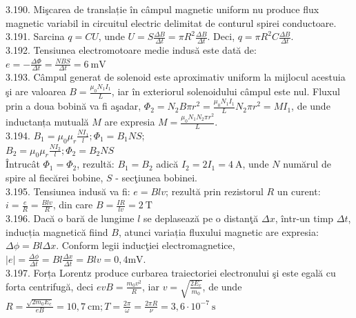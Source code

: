 \begin{center}
3.190. Mişcarea de translație în câmpul magnetic uniform nu produce flux magnetic variabil in circuitul electric delimitat de conturul spirei conductoare.\\

3.191. Sarcina $q=C U$, unde $U=S \frac{\Delta B}{\Delta t}=\pi R^{2} \frac{\Delta B}{\Delta t}$. Deci, $q=\pi R^{2} C \frac{\Delta B}{\Delta t}$.\\

3.192. Tensiunea electromotoare medie indusă este dată de:\\$e=-\frac{\Delta \Phi}{\Delta t}=\frac{N B S}{\Delta t}=6 \mathrm{~mV}$\\

3.193. Câmpul generat de solenoid este aproximativ uniform la mijlocul acestuia şi are valoarea $B=\frac{\mu_{0} N_{1} I_{1}}{L}$, iar în exteriorul solenoidului câmpul este nul. Fluxul prin a doua bobină va fi aşadar, $\Phi_{2}=N_{2} B \pi r^{2}=\frac{\mu_{0} N_{1} I_{1}}{L} N_{2} \pi r^{2}=M I_{1}$, de unde inductanța mutuală $M$ are expresia $M=\frac{\mu_{0} N_{1} N_{2} \pi r^{2}}{L}$.\\

3.194. $B_{1}=\mu_{0} \mu_{r} \frac{N I_{1}}{l} ; \Phi_{1}=B_{1} N S$;\\$B_{2}=\mu_{0} \mu_{r} \frac{N I_{2}}{l} ; \Phi_{2}=B_{2} N S$\\Întrucât $\Phi_{1}=\Phi_{2}$, rezultă: $B_{1}=B_{2}$ adică $I_{2}=2 I_{1}=4 \mathrm{~A}$, unde $N$ numărul de spire al fiecărei bobine, $S$ - secţiunea bobinei.\\

3.195. Tensiunea indusă va fi: $e=B l v$; rezultă prin rezistorul $R$ un curent:\\$i=\frac{e}{R}=\frac{B l v}{R}$, din care $B=\frac{I R}{l v}=2 \mathrm{~T}$\\

3.196. Dacă o bară de lungime $l$ se deplasează pe o distanţă $\Delta x$, într-un timp $\Delta t$, inducția magnetică fiind $B$, atunci variația fluxului magnetic are expresia: $\Delta \phi=B l \Delta x$. Conform legii inducţiei electromagnetice,\\$|e|=\frac{\Delta \phi}{\Delta t}=B l \frac{\Delta x}{\Delta t}=B l v=0,4 \mathrm{mV} .$\\

3.197. Forța Lorentz produce curbarea traiectoriei electronului şi este egală cu forta centrifugă, deci $e v B=\frac{m_{0} v^{2}}{R}$, iar $v=\sqrt{\frac{2 E_{c}}{m_{0}}}$, de unde\\$R=\frac{\sqrt{2 m_{0} E_{c}}}{e B}=10,7 \mathrm{~cm} ; T=\frac{2 \pi}{\omega}=\frac{2 \pi R}{\nu}=3,6 \cdot 10^{-7} \mathrm{~s}$\\


\end{center}
